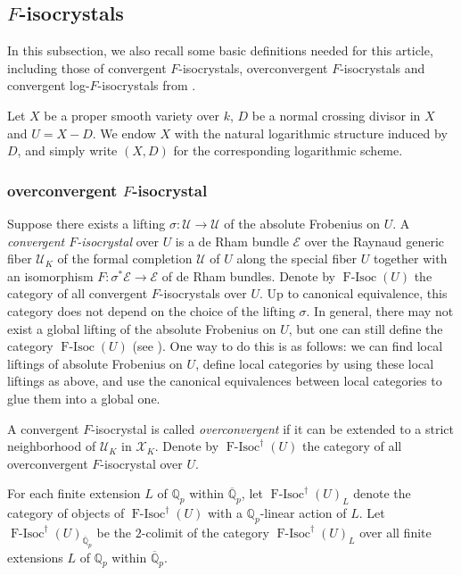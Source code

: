 \documentclass[12pt,twoside]{book}
\theoremstyle{plain}
\theoremstyle{definition}
\theoremstyle{remark}
\newcommand{\bQ}{{\mathbb Q}}
\newcommand{\mE}{{\mathcal E}}
\newcommand{\mU}{{\mathcal U}}
\newcommand{\mX}{{\mathcal X}}
\DeclareMathOperator{\FIsoc}{F-Isoc}
\numberwithin{equation}{section}
\begin{document}
\subsection{$F$-isocrystals}
In this subsection, we also recall some basic definitions needed for this article, including those of convergent $F$-isocrystals, overconvergent $F$-isocrystals and convergent log-$F$-isocrystals from \cite[Definition 2.1, Definition 2.4 and Definition 7.1]{Ked22}.

Let $X$ be a proper smooth variety over $k$, $D$ be a normal crossing divisor in $X$ and $U = X-D$. We endow $X$ with the natural logarithmic structure induced by $D$, and simply write $(X,D)$ for the corresponding logarithmic scheme.


\subsubsection{overconvergent $F$-isocrystal}
Suppose there exists a lifting $\sigma\colon \mU\rightarrow\mU$ of the absolute Frobenius on
$U$. A \emph{convergent $F$-isocrystal} over $U$ is a de Rham bundle $\mE$ over the Raynaud generic fiber $\mU_K$ of the formal completion $\mU$ of $U$ along the special fiber $U$ together with an isomorphism $F\colon \sigma^*\mE\rightarrow\mE$ of de Rham bundles. Denote by \emph{$\FIsoc(U)$} the category of all convergent $F$-isocrystals over $U$. Up to canonical equivalence, this category does not depend on the choice of the lifting $\sigma$. In general, there may not exist a global lifting of the absolute Frobenius on $U$, but one can still define the category $\FIsoc(U)$ (see \cite[definition 2.1]{Ked22}). One way to do this is as follows: we can find local liftings of absolute Frobenius on $U$, define local categories by using these local liftings as above, and use the canonical equivalences between local categories to glue them into a global one.

A convergent $F$-isocrystal is called \emph{overconvergent} if it can be extended to a strict neighborhood of $\mU_K$ in $\mX_K$. Denote by \emph{$\FIsoc^\dagger (U)$} the category of all overconvergent $F$-isocrystal over $U$.

For each finite extension $L$ of $\bQ_p$ within $\overline{\bQ}_p$, let \emph{$\FIsoc^\dagger(U)_L$} denote the category of objects of $\FIsoc^\dagger(U)$ with a $\bQ_p$-linear action of $L$. Let \emph{$\FIsoc^\dagger(U)_{\overline\bQ_p}$} be the $2$-colimit of the category $\FIsoc^\dagger(U)_L$ over all finite extensions $L$ of $\bQ_p$ within $\overline\bQ_p$.
\end{document}
